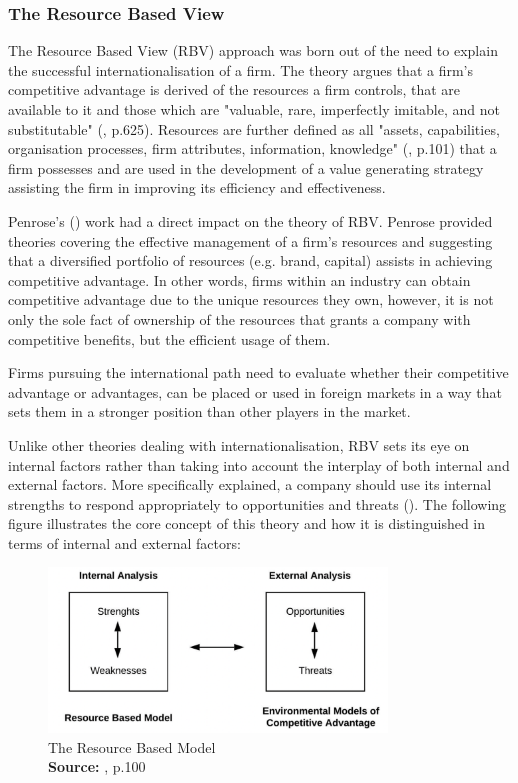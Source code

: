 \documentclass[11pt,a4paper]{article}
\newcommand*{\captionsource}[2]{%
  \caption[{#1}]{%
    #1%
    \\\hspace{\linewidth}%
    \textbf{Source:} #2%
  }%
}
\begin{document}
{{\subsubsection{The Resource Based View}
The Resource Based View (RBV) approach was born out of the need to explain the successful internationalisation of a firm. The theory argues that a firm's competitive advantage is derived of the resources a firm controls, that are available to it and those which are "valuable, rare, imperfectly imitable, and not substitutable" (\cite{barneyResourcebasedViewFirm2001}, p.625). Resources are further defined as all "assets, capabilities, organisation processes, firm attributes, information, knowledge" (\cite{barneyFirmResourcesSustained1991}, p.101) that a firm possesses and are used in the development of a value generating strategy assisting the firm in improving its efficiency and effectiveness.  \par 
Penrose's (\citeyear{penroseTheoryGrowthFirm2009}) work had a direct impact on the theory of RBV.  Penrose provided theories covering the effective management of a firm's resources and suggesting that a diversified portfolio of resources (e.g. brand, capital) assists in achieving competitive advantage. In other words, firms within an industry can obtain competitive advantage due to the unique resources they own, however, it is not only the sole fact of ownership of the resources that grants a company with competitive benefits, but the efficient usage of them. \par
Firms pursuing the international path need to evaluate whether their competitive advantage or advantages, can be placed or used in foreign markets in a way that sets them in a stronger position than other players in the market. \par
Unlike other theories dealing with internationalisation, RBV sets its eye on internal factors rather than taking into account the interplay of both internal and external factors. More specifically explained, a company should use its internal strengths to respond appropriately to opportunities and threats (\cite{barneyFirmResourcesSustained1991}). The following figure illustrates the core concept of this theory and how it is distinguished in terms of internal and external factors: \\

\begin{figure}[H]
	\centering
  \includegraphics[width=90mm]{figures/fig5_rbv_model}
  \vspace{5mm}
    \captionsetup{justification=centering,margin=2cm}
      \captionsource{The Resource Based Model}{\cite{barneyFirmResourcesSustained1991}, p.100}
	\label{fig:rbv_model}
\end{figure}


}}
\end{document}
